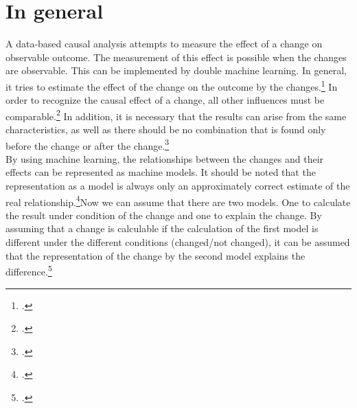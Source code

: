     \section{In general}
    A data-based causal analysis attempts to measure the effect of a change on observable outcome. The measurement of this effect is possible when the changes are observable. This can be implemented by double machine learning. In general, it tries to estimate the effect of the change on the outcome by the changes.\footcite[see][106]{mahu2020} In order to recognize the causal effect of a change, all other influences must be comparable.\footcite[see][107]{mahu2020} In addition, it is necessary that the results can arise from the same characteristics, as well as there should be no combination that is found only before the change or after the change.\footcite[see][109]{mahu2020}\\
    By using machine learning, the relationships between the changes and their effects can be represented as machine models. It should be noted that the representation as a model is always only an approximately correct estimate of the real relationship.\footcite[see][111]{mahu2020}Now we can assume that there are two models. One to calculate the result under condition of the change and one to explain the change. By assuming that a change is calculable if the calculation of the first model is different under the different conditions (changed/not changed), it can be assumed that the representation of the change by the second model explains the difference.\footcite[see][112\psqq]{mahu2020}

